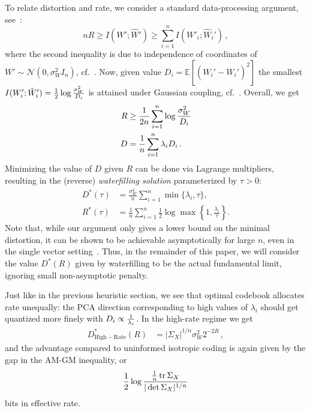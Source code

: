 \documentclass[journal]{IEEEtran}
\newcommand{\RR}{\mathbb{R}}
\newcommand{\trace}{\mathop{\mathrm{tr}}}
\def\tr{\trace}
\def\EE{\mathbb{E}}
\newcommand{\HR}{\mathrm{High-Rate}}
\begin{document}
To relate distortion and rate, we consider a standard data-processing argument, see~\cite[Section 23.4]{PWbook24}:
$$ nR \ge I(W';\hat W') \ge \sum_{i=1}^n I(W'_i; \hat W_i')\,,$$
where the second inequality is due to independence of coordinates of $W'\sim
\mathcal{N}(0,\sigma_W^2 I_n)$, cf.~\cite[Theorem 6.1]{PWbook24}. Now, given value $D_i =
\EE[(\hat W_i'-W_i')^2]$ the smallest $I(W'_i; \hat W_i')={1\over 2} \log {\sigma_W^2\over D_i}$
is attained under Gaussian coupling, cf.~\cite[Section 26.1.2]{PWbook24}. Overall, we get
\begin{align*} R &\ge {1\over 2n} \sum_{i=1}^n \log {\sigma_W^2 \over D_i} \\
   D &= {1\over n} \sum_{i=1}^n \lambda_i D_i\,.
\end{align*}   
Minimizing the value of $D$ given $R$ can be done via Lagrange multipliers, resulting in the (reverse)
\emph{waterfilling solution} parameterized by $\tau>0$:
\begin{align}
D^*(\tau) &=\frac{\sigma_W^2}{n}\sum_{i=1}^n \min\{\lambda_i,\tau\},\nonumber\\
R^*(\tau) &=\frac{1}{n}\sum_{i=1}^n\frac{1}{2}\log \max\left\{1,\frac{\lambda_i}{\tau}\right\}.
\label{eq:waterfillingsolution}
\end{align}
Note that, while our argument only gives a lower bound on the minimal distortion, it can be shown
to be achievable asymptotically for large $n$, even in the single vector setting~\cite[Proposition 2.1]{HOP26}. %
Thus, in the remainder
of this paper, we will consider the value $D^*(R)$ given by waterfilling to be the actual
fundamental limit, ignoring small non-asymptotic penalty.


Just like in the previous heuristic section, we see that optimal codebook allocates rate
unequally: the PCA direction corresponding to high values of $\lambda_i$ should get quantized more
finely with $D_i \propto {1\over \lambda_i}$. In the high-rate regime we get 
\begin{align}
D_{\HR}^*(R)&=%
|\Sigma_X|^{1/n}\sigma_W^2 2^{-2R}\,,    
\label{eq:Dhr}
\end{align}
and the advantage compared to uninformed isotropic coding is again given by the gap in the AM-GM
inequality, or 
$$ {1\over 2} \log {{1\over n} \tr \Sigma_X\over |\det \Sigma_X|^{1/n}} $$
bits in effective rate.
\end{document}
